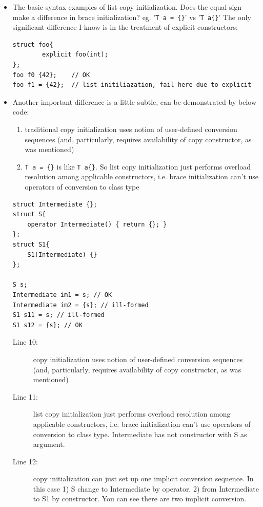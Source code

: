 \documentclass[a4paper,11pt,twoside]{book}
\begin{document}
\begin{itemize}

	\item The basic syntax examples of list copy initialization. Does the equal sign make a difference in brace initialization? eg. '\texttt{T a = \{\}}' vs '\texttt{T a\{\}}' The only significant difference I know is in the treatment of explicit constructors:
	
\begin{lstlisting}
struct foo{
		explicit foo(int);
};
foo f0 {42};    // OK
foo f1 = {42};  // list initiliazation, fail here due to explicit
\end{lstlisting}

	\item Another important difference is a little subtle, can be demonstrated by below code:
	\begin{enumerate}
		\item traditional copy initialization uses notion of user-defined conversion sequences (and, particularly, requires availability of copy constructor, as was mentioned)
		
		\item \texttt{T a = \{\}} is like \texttt{T a\{\}}. So list copy initialization just performs overload resolution among applicable constructors, i.e. brace initialization can't use operators of conversion to class type
	\end{enumerate}
\begin{lstlisting}
struct Intermediate {};
struct S{
	operator Intermediate() { return {}; }
};
struct S1{
	S1(Intermediate) {}
};
	
S s;
Intermediate im1 = s; // OK
Intermediate im2 = {s}; // ill-formed
S1 s11 = s; // ill-formed
S1 s12 = {s}; // OK
\end{lstlisting}
	
	\begin{description}
		\item[Line 10:] copy initialization uses notion of user-defined conversion sequences (and, particularly, requires availability of copy constructor, as was mentioned)
		
		\item[Line 11:] list copy initialization just performs overload resolution among applicable constructors, i.e. brace initialization can't use operators of conversion to class type. Intermediate has not constructor with S as argument.
		
		\item[Line 12:] copy initialization can just set up one implicit conversion sequence. In this case 1) S change to Intermediate by operator, 2) from Intermediate to S1 by constructor.  You can see there are two implicit conversion.
		

\end{description}
\end{itemize}
\end{document}

